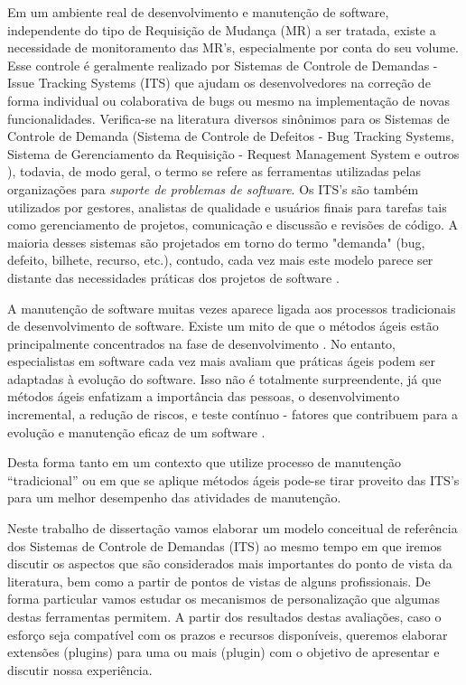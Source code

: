 \documentclass[msc,proposal,hidelot,hideabstract]{ppgccufmg} %
\begin{document}
Em um ambiente real de desenvolvimento e manutenção de software, independente do tipo
de Requisição de Mudança (MR) a ser tratada, existe a necessidade de
monitoramento das MR's, especialmente por conta do seu volume. Esse controle é geralmente realizado
por Sistemas de Controle de Demandas - Issue Tracking Systems (ITS) que ajudam
os desenvolvedores na correção de forma individual ou colaborativa de bugs  ou
mesmo na implementação de novas funcionalidades. Verifica-se na literatura diversos
sinônimos para os Sistemas de Controle de Demanda (Sistema de Controle de
Defeitos - Bug Tracking Systems, Sistema de Gerenciamento da Requisição -
Request Management System e outros ), todavia, de modo geral, o
termo se refere as ferramentas utilizadas pelas organizações para \textit{suporte de problemas de software}. Os ITS's são também utilizados por gestores, analistas de qualidade e usuários finais para
tarefas tais como gerenciamento de projetos, comunicação e discussão e revisões
de código. A maioria desses sistemas são projetados em torno do termo "demanda"
(bug, defeito, bilhete, recurso, etc.), contudo, cada vez mais este modelo parece
ser distante das necessidades práticas dos projetos de software
\cite{Baysal:2013:SAP:2486788.2486957}.

A manutenção de software muitas vezes aparece ligada aos processos tradicionais
de desenvolvimento de software. Existe um mito de que o métodos ágeis estão
principalmente concentrados na fase de desenvolvimento
\cite{kajko2009model}. No entanto, especialistas em software cada vez mais
avaliam que práticas ágeis podem ser adaptadas à evolução do software. Isso não
é totalmente surpreendente, já que métodos ágeis enfatizam a importância das
pessoas, o desenvolvimento incremental, a redução de riscos, e teste contínuo -
fatores que contribuem para a evolução e manutenção  eficaz de um software
\cite{thomas2006agile}.

Desta forma tanto em um contexto que utilize processo de manutenção
``tradicional'' ou em que se aplique métodos ágeis pode-se tirar proveito das
ITS's para um melhor desempenho das atividades de manutenção.

Neste trabalho de dissertação vamos elaborar um modelo conceitual de referência
dos Sistemas de Controle de Demandas (ITS) ao mesmo tempo em que iremos discutir os aspectos que
são considerados mais importantes do ponto de vista da literatura, bem como a partir de pontos de vistas de alguns
profissionais. De forma particular vamos estudar os mecanismos de
personalização que algumas destas ferramentas permitem. A partir dos resultados destas avaliações, caso o esforço seja
compatível com os prazos e recursos disponíveis, queremos elaborar extensões (plugins)
para uma ou mais (plugin) com o objetivo de apresentar e
discutir nossa experiência.
\end{document}
